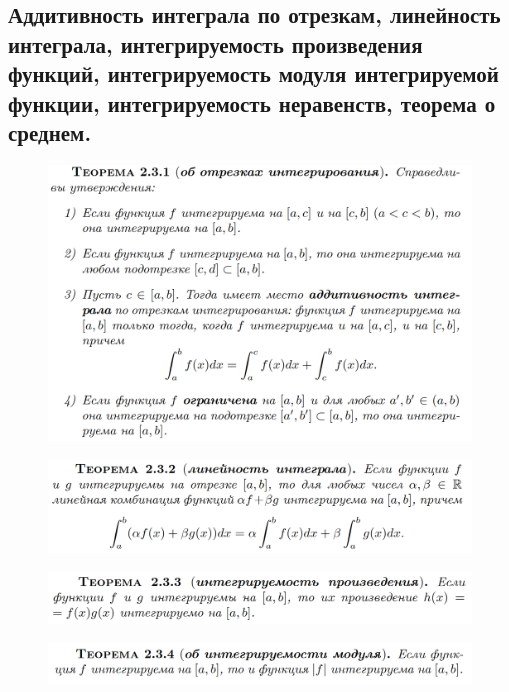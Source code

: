 \documentclass{article}
\begin{document}
\subsection{Аддитивность интеграла по отрезкам, линейность интеграла, интегрируемость произведения функций, интегрируемость модуля интегрируемой функции, интегрируемость неравенств, теорема о среднем.}
\begin{figure}[h!]
    \centering
    \includegraphics[width=\textwidth]{65.png}
    \vspace{-1cm}
\end{figure}
\begin{figure}[h!]
    \centering
    \includegraphics[width=\textwidth]{66.png}
    \vspace{-1cm}
\end{figure}
\begin{figure}[h!]
    \centering
    \includegraphics[width=\textwidth]{68.png}
    \vspace{-1cm}
\end{figure}
\begin{figure}[h!]
    \centering
    \includegraphics[width=\textwidth]{69.png}
    \vspace{-1cm}
\end{figure}
\end{document}
